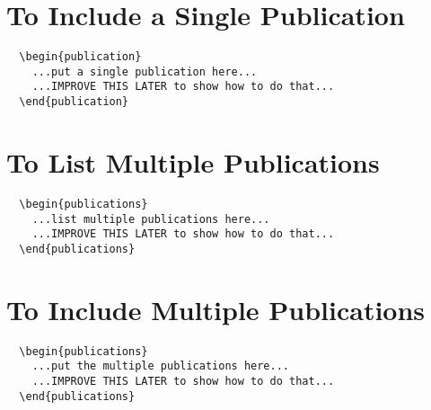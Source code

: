 \section*{To Include a Single Publication}

\begin{verbatim}
  \begin{publication}
    ...put a single publication here...
    ...IMPROVE THIS LATER to show how to do that...
  \end{publication}
\end{verbatim}


\section*{To List Multiple Publications}

\begin{verbatim}
  \begin{publications}
    ...list multiple publications here...
    ...IMPROVE THIS LATER to show how to do that...
  \end{publications}
\end{verbatim}


\section*{To Include Multiple Publications}

\begin{verbatim}
  \begin{publications}
    ...put the multiple publications here...
    ...IMPROVE THIS LATER to show how to do that...
  \end{publications}
\end{verbatim}
